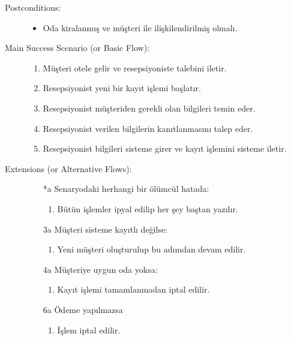 \documentclass[12pt,a4paper]{report}
\begin{document}
\begin{description}
\item[Postconditions:] \hspace{10mm}
\begin{itemize}
\item Oda kiralanmış ve müşteri ile ilişkilendirilmiş olmalı.
\end{itemize}
\item[Main Success Scenario (or Basic Flow):] \hspace{10mm}
\begin{enumerate}
\item Müşteri otele gelir ve resepsiyoniste talebini iletir.
\item Resepsiyonist yeni bir kayıt işlemi başlatır.
\item Resepsiyonist müşteriden gerekli olan bilgileri temin eder.
\item Resepsiyonist verilen bilgilerin kanıtlanmasını talep eder.
\item Resepsiyonist bilgileri sisteme girer ve kayıt işlemini sisteme iletir.
\end{enumerate}
\item[Extensions (or Alternative Flows):] \hspace{10mm}
\begin{itemize}
\item[*a] Senaryodaki herhangi bir ölümcül hatada:
    \begin{enumerate}
    \item Bütün işlemler ipyal edilip her şey baştan yazılır.
    \end{enumerate}
\item[3a] Müşteri sisteme kayıtlı değilse:
    \begin{enumerate}
    \item Yeni müşteri oluşturulup bu adımdan devam edilir.
    \end{enumerate}
\item[4a] Müşteriye uygun oda yoksa:
    \begin{enumerate} 
    \item Kayıt işlemi tamamlanmadan iptal edilir.
    \end{enumerate}
\item[6a] Ödeme yapılmazsa
    \begin{enumerate}
    \item İşlem iptal edilir.
    \end{enumerate}
\end{itemize}
\end{description}
\end{document}
